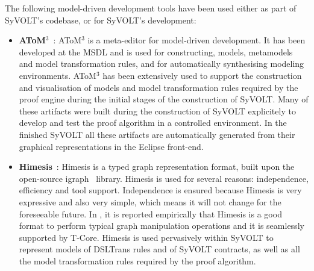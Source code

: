  The following model-driven development tools have been used
either as part of SyVOLT's codebase, or for SyVOLT's development:
\begin{itemize}

  \item \textbf{AToM$^3$}~\cite{atom3:2002}: AToM$^3$ is a
  meta-editor for
  model-driven development.
  It has been developed at the MSDL and is used for constructing,
  models, metamodels and model transformation rules, and for automatically 
  synthesising modeling environments.
  AToM$^3$ has been extensively used to support the construction and
  visualisation of models and model transformation rules required by the proof
  engine during the initial stages of the construction of SyVOLT. 
  Many of these artifacts were built during the construction
  of SyVOLT explicitely to develop and test the proof algorithm in a
  controlled environment. In the finished SyVOLT all these artifacts are automatically
  generated from their graphical representations in the Eclipse front-end.\\

  \item \textbf{Himesis}~\cite{Provost2006}: Himesis is a typed graph representation
  format, built upon the open-source igraph~\cite{igraphTool} library. 
Himesis is used for several reasons: independence, efficiency and
tool support.
Independence is ensured because Himesis is very expressive and also
very simple, which means it will not change for the foreseeable
future.
In \cite{Syriani2010b}, it is reported empirically that Himesis is a good format to perform typical graph
manipulation operations and it is seamlessly supported by T-Core.
  Himesis is used pervasively within SyVOLT to represent models of 
  DSLTrans rules and of SyVOLT contracts, as well as all the model
  transformation rules required by the proof algorithm.\\
  

\end{itemize}
